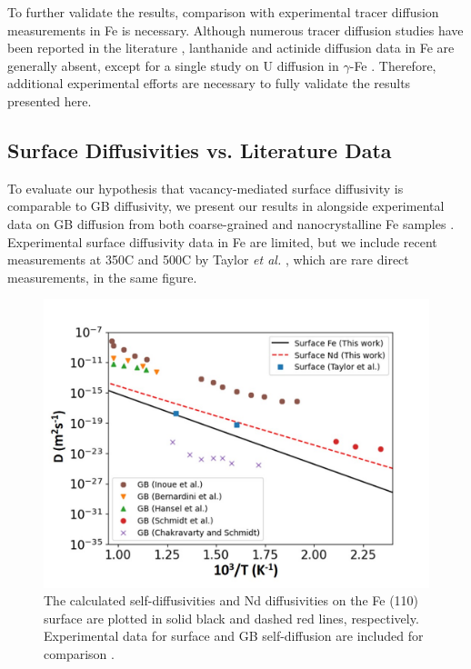 \documentclass[preprint,12pt]{elsarticle}
\begin{document}
To further validate the results, comparison with experimental tracer diffusion measurements in Fe is necessary. Although numerous tracer diffusion studies have been reported in the literature \cite{neumann2011self}, lanthanide and actinide diffusion data in Fe are generally absent, except for a single study on U diffusion in $\gamma$-Fe \cite{de1967fissiographie}. Therefore, additional experimental efforts are necessary to fully validate the results presented here. 



\FloatBarrier


\subsection{Surface Diffusivities vs. Literature Data}
\label{sec:discussion2}

\noindent To evaluate our hypothesis that vacancy-mediated surface diffusivity is comparable to GB diffusivity, we present our results in  alongside experimental data on GB diffusion from both coarse-grained \cite{inoue2007grain, bernardini1982role, hansel1985effects} and nanocrystalline Fe samples \cite{schmidt2012grain, chakravarty2009self}. Experimental surface diffusivity data in Fe are limited, but we include recent measurements at 350\textdegree C and 500\textdegree C by Taylor \textit{et al.} \cite{taylor2024directly}, which are rare direct measurements, in the same figure.

\begin{figure}[!ht]
    \centering
    \includegraphics[width=0.8\linewidth]{surface_diff_exp.jpg}
    \caption{The calculated self-diffusivities and Nd diffusivities on the Fe (110) surface are plotted in solid black and dashed red lines, respectively. Experimental data for surface and GB self-diffusion are included for comparison \cite{taylor2024directly,inoue2007grain,bernardini1982role,hansel1985effects, schmidt2012grain, chakravarty2009self}.}
    \label{fig:surf_diff_exp}
\end{figure}
\end{document}

